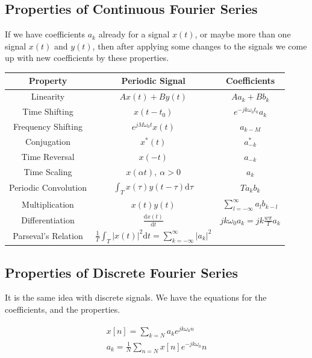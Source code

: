 \documentclass[12pt,letterpaper]{article} \usepackage{amsmath} \usepackage{graphicx} \usepackage[margin=1in]{geometry} \usepackage{longtable}  \usepackage{amssymb}
\begin{document}
	\subsection{Properties of Continuous Fourier Series}
	If we have coefficients $a_k$ already for a signal $x(t)$, or maybe more than one signal $x(t)$ and $y(t)$, then after applying some changes to the signals we come up with new coefficients by these properties.
	\begin{center}
		\begin{tabular}{|c||c|c|}
			\hline
			Property & Periodic Signal & Coefficients \\
			\hline\hline
			Linearity & $A x(t) + B y(t)$ & $A a_k + B b_k$ \\
			\hline
			Time Shifting & $x(t-t_0)$ & $e^{-jk\omega_0 t_0} a_k$ \\
			\hline
			Frequency Shifting & $e^{jM\omega_0 t} x(t)$ & $a_{k-M}$ \\
			\hline
			Conjugation & $x^*(t)$ & $a^*_{-k}$ \\
			\hline
			Time Reversal & $x(-t)$ & $a_{-k}$ \\
			\hline
			Time Scaling & $x(\alpha t), \ \alpha > 0$ & $a_k$ \\
			\hline
			Periodic Convolution & $\int_T x(\tau) y(t-\tau) \mathrm{d}\tau$ & $T a_k b_k$ \\
			\hline
			Multiplication & $x(t) y(t)$ & $\sum^{\infty}_{l=-\infty} a_l b_{k-l}$ \\
			\hline
			Differentiation & $\frac{\mathrm{d} x(t)}{\mathrm{d} t}$ & $j k \omega_0 a_k = j k \frac{w \pi}{T} a_k$ \\
			\hline
			Parseval's Relation & $\frac{1}{T} \int_T |x(t)|^2 \mathrm{d} t = \sum^{\infty}_{k=-\infty} |a_k|^2$ &  \\
			\hline
		\end{tabular}
	\end{center}
	
	
	\subsection{Properties of Discrete Fourier Series}
	It is the same idea with discrete signals. We have the equations for the coefficients, and the properties. 
	
	\begin{align}
		x[n] = \sum_{k=N} a_k e^{jk\omega_0 n}\\
		a_k = \frac{1}{N} \sum _{n=N} x[n]e^{-jk\omega _0}n
	\end{align}
	
\end{document}
